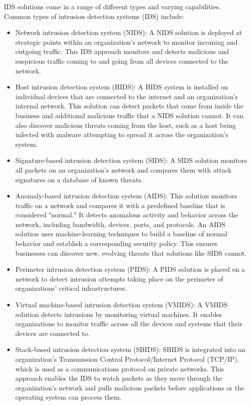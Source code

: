 IDS solutions come in a range of different types and varying capabilities. Common types of intrusion detection systems (IDS) include:
\begin{itemize}
    \item Network intrusion detection system (NIDS): A NIDS solution is deployed at strategic points within an organization’s network to monitor incoming and outgoing traffic. This IDS approach monitors and detects malicious and suspicious traffic coming to and going from all devices connected to the network.
    \item Host intrusion detection system (HIDS): A HIDS system is installed on individual devices that are connected to the internet and an organization’s internal network. This solution can detect packets that come from inside the business and additional malicious traffic that a NIDS solution cannot. It can also discover malicious threats coming from the host, such as a host being infected with malware attempting to spread it across the organization’s system.
    \item Signature-based intrusion detection system (SIDS): A SIDS solution monitors all packets on an organization’s network and compares them with attack signatures on a database of known threats. 
    \item Anomaly-based intrusion detection system (AIDS): This solution monitors traffic on a network and compares it with a predefined baseline that is considered "normal." It detects anomalous activity and behavior across the network, including bandwidth, devices, ports, and protocols. An AIDS solution uses machine-learning techniques to build a baseline of normal behavior and establish a corresponding security policy. This ensures businesses can discover new, evolving threats that solutions like SIDS cannot. 
    \item Perimeter intrusion detection system (PIDS): A PIDS solution is placed on a network to detect intrusion attempts taking place on the perimeter of organizations’ critical infrastructures.
    \item Virtual machine-based intrusion detection system (VMIDS): A VMIDS solution detects intrusions by monitoring virtual machines. It enables organizations to monitor traffic across all the devices and systems that their devices are connected to.
    \item Stack-based intrusion detection system (SBIDS): SBIDS is integrated into an organization’s Transmission Control Protocol/Internet Protocol (TCP/IP), which is used as a communications protocol on private networks. This approach enables the IDS to watch packets as they move through the organization’s network and pulls malicious packets before applications or the operating system can process them.
\end{itemize}

